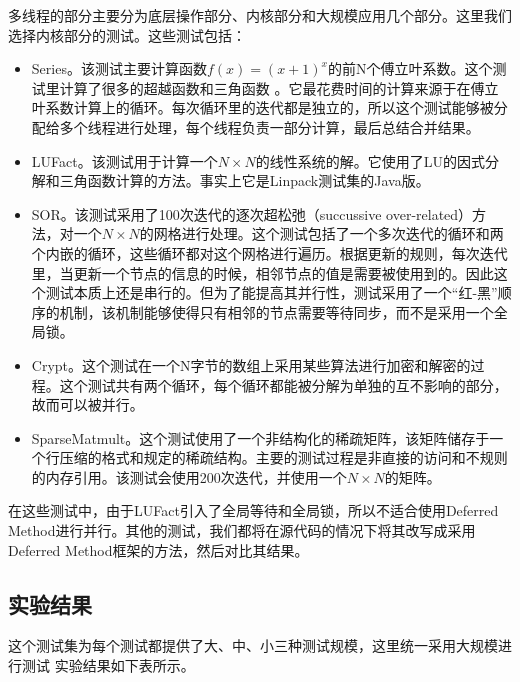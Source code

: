 多线程的部分主要分为底层操作部分、内核部分和大规模应用几个部分。这里我们选择内核部分的测试。这些测试包括：

\begin{itemize}
	\item Series。该测试主要计算函数$f(x) = (x + 1)^x$的前N个傅立叶系数。这个测试里计算了很多的超越函数和三角函数 。它最花费时间的计算来源于在傅立叶系数计算上的循环。每次循环里的迭代都是独立的，所以这个测试能够被分配给多个线程进行处理，每个线程负责一部分计算，最后总结合并结果。
	\item LUFact。该测试用于计算一个$N \times N$的线性系统的解。它使用了LU的因式分解和三角函数计算的方法。事实上它是Linpack测试集的Java版。
	\item SOR。该测试采用了100次迭代的逐次超松弛（succussive over-related）方法，对一个$N \times N$的网格进行处理。这个测试包括了一个多次迭代的循环和两个内嵌的循环，这些循环都对这个网格进行遍历。根据更新的规则，每次迭代里，当更新一个节点的信息的时候，相邻节点的值是需要被使用到的。因此这个测试本质上还是串行的。但为了能提高其并行性，测试采用了一个“红-黑”顺序的机制，该机制能够使得只有相邻的节点需要等待同步，而不是采用一个全局锁。
	\item Crypt。这个测试在一个N字节的数组上采用某些算法进行加密和解密的过程。这个测试共有两个循环，每个循环都能被分解为单独的互不影响的部分，故而可以被并行。
	\item SparseMatmult。这个测试使用了一个非结构化的稀疏矩阵，该矩阵储存于一个行压缩的格式和规定的稀疏结构。主要的测试过程是非直接的访问和不规则的内存引用。该测试会使用200次迭代，并使用一个$N \times N$的矩阵。
\end{itemize}

在这些测试中，由于LUFact引入了全局等待和全局锁，所以不适合使用Deferred Method进行并行。其他的测试，我们都将在源代码的情况下将其改写成采用Deferred Method框架的方法，然后对比其结果。

\subsection{实验结果}

这个测试集为每个测试都提供了大、中、小三种测试规模，这里统一采用大规模进行测试
实验结果如下表所示。

